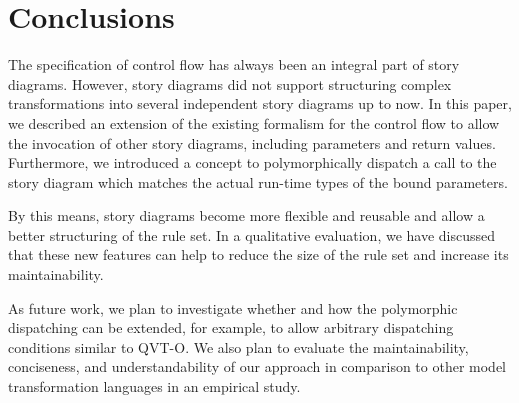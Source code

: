 \chapter{Conclusions}

The specification of control flow has always been an integral part of story diagrams.
However, story diagrams did not support structuring complex transformations into several independent story diagrams up to now. 
In this paper, we described an extension of the existing formalism for the control flow to allow the invocation of other story diagrams, including parameters and return values.
Furthermore, we introduced a concept to polymorphically dispatch a call to the story diagram which matches the actual run-time types of the bound parameters. 

By this means, story diagrams become more flexible and reusable and allow a better structuring of the rule set. 
In a qualitative evaluation, we have discussed that these new features can help to reduce the size of the rule set and increase its maintainability.

As future work, we plan to investigate whether and how the polymorphic dispatching can be extended, for example, to allow arbitrary dispatching conditions similar to QVT-O.
We also plan to evaluate the maintainability, conciseness, and understandability of our approach in comparison to other model transformation languages in an empirical study.